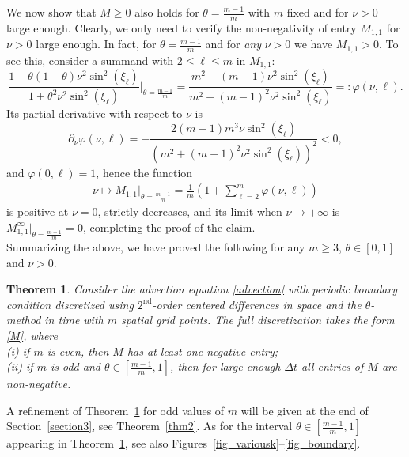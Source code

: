 \documentclass[a4paper]{article}
\newtheorem{theorem}{Theorem}
\newcommand{\dt}{\Delta t}
\newcommand{\te}{\theta}
\begin{document}
\begin{description}[style=unboxed,leftmargin=0cm]
We now show that $M\ge 0$ also holds for $\theta=\frac{m-1}{m}$ with $m$ fixed and for $\nu>0$ large enough. 
Clearly, we only need to verify the non-negativity of entry $M_{1,1}$ for $\nu>0$ large enough. 
In fact, for $\theta=\frac{m-1}{m}$ and for \emph{any} $\nu>0$ we have $M_{1,1}> 0$. To see this, consider a summand with $2\le\ell\le m$ in $M_{1,1}$: 
\[
 \frac{1-\theta(1-\theta)\nu^2\sin^2(\xi_\ell)}{1+\theta^2\nu^2\sin^2(\xi_\ell)}\Bigg|_{\theta=\frac{m-1}{m}}=
 \frac{m^2-(m-1) \nu ^2 \sin ^2\left(\xi _\ell\right)}{m^2+(m-1)^2 \nu ^2 \sin ^2\left(\xi _\ell\right)}=:\varphi(\nu,\ell).
\]
Its partial derivative with respect to $\nu$ is
\[
\partial_\nu\varphi(\nu,\ell)=-\frac{2 (m-1) m^3 \nu  \sin ^2\left(\xi _\ell\right)}{\left(m^2+(m-1)^2 \nu ^2 \sin ^2\left(\xi _\ell\right)\right)^2}<0,
\]
and $\varphi(0,\ell)=1$, hence the function
\begin{align*}
	\nu\mapsto M_{1,1}\Big|_{\theta=\frac{m-1}{m}} =
		\frac{1}{m} \left(1 + \sum_{\ell=2}^{m} \varphi(\nu,\ell)\right)
\end{align*}
is positive at $\nu=0$, strictly decreases, and its limit when $\nu\to +\infty$ is
$M_{1,1}^\infty\big|_{\theta=\frac{m-1}{m}}=0$, completing the proof of the claim.\\

Summarizing the above, we have proved the following for any $m\ge 3$, $\te\in[0,1]$ and
$\nu>0$.
\end{description}
\begin{theorem}\label{thm1}
Consider the advection equation \eqref{advection} with periodic boundary condition discretized using
$2^{\text{nd}}$-order centered differences in space and the $\theta$-method in time with $m$ spatial grid
points.
The full discretization takes the form \eqref{M},
where\\
(i) if $m$ is even, then $M$ has at least one negative entry;\\
(ii) if $m$ is odd and $\theta\in\left[\frac{m-1}{m},1\right]$, then for large enough $\dt$ all
entries of $M$ are non-negative.
\end{theorem}



A refinement of Theorem~\ref{thm1} for odd values of $m$ will be given at the end of
Section~\ref{section3}, see Theorem~\ref{thm2}.
As for the interval $\theta\in\left[\frac{m-1}{m},1\right]$ appearing in Theorem~\ref{thm1}, see also
Figures~\ref{fig_variousk}--\ref{fig_boundary}.
\end{document}
